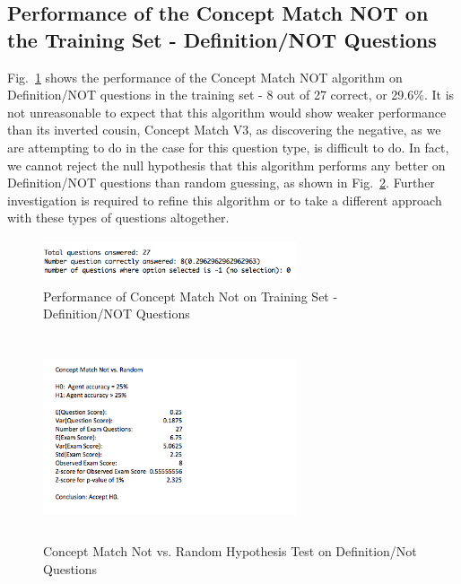 \subsection{Performance of the Concept Match NOT on the Training Set - Definition/NOT Questions}

Fig.~\ref{fig:concept_match_not_training_set_performance} shows the performance of the Concept Match NOT algorithm on Definition/NOT questions in the training set - 8 out of 27 correct, or 29.6\%.  It is not unreasonable to expect that this algorithm would show weaker performance than its inverted cousin, Concept Match V3, as discovering the negative, as we are attempting to do in the case for this question type, is difficult to do.  In fact, we cannot reject the null hypothesis that this algorithm performs any better on Definition/NOT questions than random guessing, as shown in Fig.~\ref{fig:concept_match_not_hypothesis_test}.  Further investigation is required to refine this algorithm or to take a different approach with these types of questions altogether.



\begin{figure}
\centering
\vspace{0.75in}
\includegraphics[width=75mm, height=13mm]{concept_match_not_training_set_performance.png}
\caption{Performance of Concept Match Not on Training Set - Definition/NOT Questions}
\label{fig:concept_match_not_training_set_performance}
\end{figure}

\begin{figure}
\centering
\vspace{0.75in}
\includegraphics[width=75mm, height=60mm]{concept_match_not_hypothesis_test.png}
\caption{Concept Match Not vs. Random Hypothesis Test on Definition/Not Questions}
\label{fig:concept_match_not_hypothesis_test}
\end{figure}




